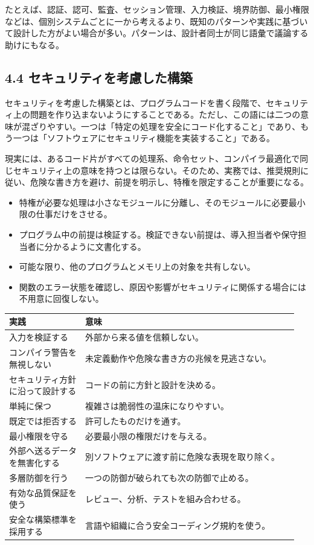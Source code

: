 \documentclass[uplatex,dvipdfmx,a4paper,11pt]{jsarticle}
\begin{document}
たとえば、認証、認可、監査、セッション管理、入力検証、境界防御、最小権限などは、個別システムごとに一から考えるより、既知のパターンや実践に基づいて設計した方がよい場合が多い。パターンは、設計者同士が同じ語彙で議論する助けにもなる。

\subsection{4.4 セキュリティを考慮した構築}
セキュリティを考慮した構築とは、プログラムコードを書く段階で、セキュリティ上の問題を作り込まないようにすることである。ただし、この語には二つの意味が混ざりやすい。一つは「特定の処理を安全にコード化すること」であり、もう一つは「ソフトウェアにセキュリティ機能を実装すること」である。

現実には、あるコード片がすべての処理系、命令セット、コンパイラ最適化で同じセキュリティ上の意味を持つとは限らない。そのため、実務では、推奨規則に従い、危険な書き方を避け、前提を明示し、特権を限定することが重要になる。

\begin{itemize}[leftmargin=2em]
\item 特権が必要な処理は小さなモジュールに分離し、そのモジュールに必要最小限の仕事だけをさせる。
\item プログラム中の前提は検証する。検証できない前提は、導入担当者や保守担当者に分かるように文書化する。
\item 可能な限り、他のプログラムとメモリ上の対象を共有しない。
\item 関数のエラー状態を確認し、原因や影響がセキュリティに関係する場合には不用意に回復しない。
\end{itemize}
\begin{longtable}{>{\raggedright\arraybackslash}p{0.25\linewidth}>{\raggedright\arraybackslash}p{0.7\linewidth}}
\toprule
\textbf{実践} & \textbf{意味} \\
\midrule
\endhead
入力を検証する & 外部から来る値を信頼しない。 \\
コンパイラ警告を無視しない & 未定義動作や危険な書き方の兆候を見逃さない。 \\
セキュリティ方針に沿って設計する & コードの前に方針と設計を決める。 \\
単純に保つ & 複雑さは脆弱性の温床になりやすい。 \\
既定では拒否する & 許可したものだけを通す。 \\
最小権限を守る & 必要最小限の権限だけを与える。 \\
外部へ送るデータを無害化する & 別ソフトウェアに渡す前に危険な表現を取り除く。 \\
多層防御を行う & 一つの防御が破られても次の防御で止める。 \\
有効な品質保証を使う & レビュー、分析、テストを組み合わせる。 \\
安全な構築標準を採用する & 言語や組織に合う安全コーディング規約を使う。 \\
\bottomrule
\end{longtable}
\end{document}
